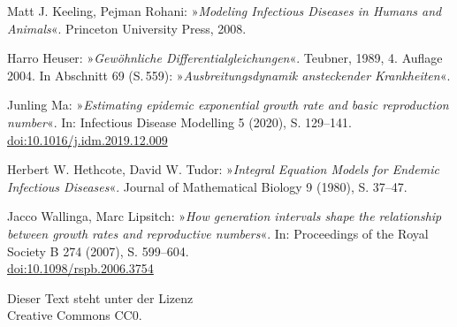 \documentclass[a4paper,10pt,fleqn,twocolumn,twoside,dvipdfmx]{scrartcl}
\numberwithin{equation}{section}
\begin{document}
\newpage
\begin{thebibliography}{00}
 Matt J. Keeling, Pejman Rohani:
»\emph{Modeling Infectious Diseases in Humans and Animals}«.
Princeton University Press, 2008.

 Harro Heuser: »\emph{Gewöhnliche Differentialgleichungen}«.
Teubner, 1989, 4. Auflage 2004. In Abschnitt 69 (S.\,559):
»\emph{Ausbreitungsdynamik ansteckender Krankheiten}«.

 Junling Ma: »\emph{Estimating epidemic exponential growth
rate and basic reproduction number}«. In: Infectious Disease Modelling 5
(2020), S. 129--141.\\
\href{https://doi.org/10.1016/j.idm.2019.12.009}%
{doi:10.1016/j.idm.2019.12.009}

 Herbert W. Hethcote, David W. Tudor:
»\emph{Integral Equation Models for Endemic Infectious Diseases}«.
Journal of Mathematical Biology 9 (1980), S. 37--47.

 Jacco Wallinga, Marc Lipsitch:
»\emph{How generation intervals shape the relationship
between growth rates and reproductive numbers}«.
In: Proceedings of the Royal Society B 274 (2007), S. 599--604.\\
\href{https://doi.org/10.1098/rspb.2006.3754}{doi:10.1098/rspb.2006.3754}
\end{thebibliography}
\vfill

\noindent
{\small Dieser Text steht unter der Lizenz\\
Creative Commons CC0.}
\end{document}
